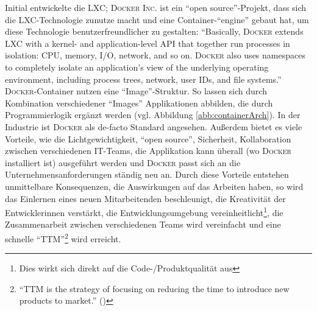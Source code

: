 Initial entwickelte \cite{canonical_ltd_linux_2020} die \ac{LXC}; \textsc{Docker Inc.} ist ein \enquote{open source}-Projekt, dass sich die \ac{LXC}-Technologie zunutze macht und eine Container-\enquote{engine} gebaut hat, um diese Technologie benutzerfreundlicher zu gestalten: \enquote{Basically, \textsc{Docker} extends LXC with a kernel- and application-level API that together run processes in isolation: CPU, memory, I/O, network, and so on. \textsc{Docker} also uses namespaces to completely isolate an application’s view of the underlying operating environment, including process trees, network, user IDs, and file systems.}\autocite[][S.82]{bernstein_containers_2014} \textsc{Docker}-Container nutzen eine \enquote{Image}-Struktur. So lassen sich durch Kombination verschiedener \enquote{Images} Applikationen abbilden, die durch Programmierlogik ergänzt werden (vgl. Abbildung \vref{abb:containerArch}). In der Industrie ist \textsc{Docker} als de-facto Standard\autocite[vgl.][S.30]{pahl_containerization_2015} angesehen\autocite[vgl.][S.1]{kharb_automated_2016}. Außerdem bietet es viele Vorteile, wie die Lichtgewichtigkeit, \enquote{open source}, Sicherheit, Kollaboration zwischen verschiedenen IT-Teams, die Applikation kann überall (wo \textsc{Docker} installiert ist) ausgeführt werden und \textsc{Docker} passt sich an die Unternehmensanforderungen ständig neu an.\autocite[vgl.][S.1]{kharb_automated_2016} Durch diese Vorteile entstehen unmittelbare Konsequenzen, die Auswirkungen auf das Arbeiten haben, so wird das Einlernen eines neuen Mitarbeitenden beschleunigt, die Kreativität der Entwicklerinnen verstärkt, die Entwicklungsumgebung vereinheitlicht\footnote{Dies wirkt sich direkt auf die Code-/Produktqualität aus}, die Zusammenarbeit zwischen verschiedenen Teams wird vereinfacht und eine schnelle \enquote{\ac{TTM}}\footnote{\enquote{TTM is the strategy of focusing on reducing the time to introduce new products to market.} (\cite{pawar_time_1994})} wird erreicht.\autocite[vgl.][S.2]{kharb_automated_2016} 
\par 

